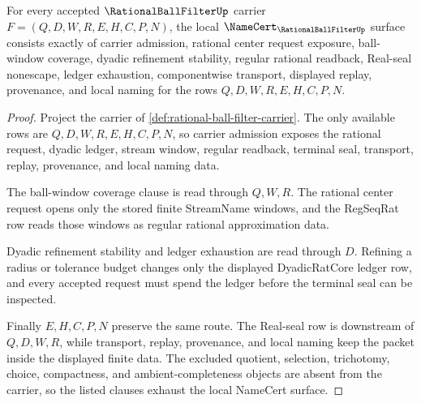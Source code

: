 \begin{theorem}
\label{thm:rational-ball-filter-namecert-obligations}
For every accepted $\RationalBallFilterUp$ carrier $F=(Q,D,W,R,E,H,C,P,N)$, the local $\NameCert_{\RationalBallFilterUp}$ surface consists exactly of carrier admission, rational center request exposure, ball-window coverage, dyadic refinement stability, regular rational readback, Real-seal nonescape, ledger exhaustion, componentwise transport, displayed replay, provenance, and local naming for the rows $Q,D,W,R,E,H,C,P,N$.
\end{theorem}
\begin{proof}
Project the carrier of \autoref{def:rational-ball-filter-carrier}. The only available rows are $Q,D,W,R,E,H,C,P,N$, so carrier admission exposes the rational request, dyadic ledger, stream window, regular readback, terminal seal, transport, replay, provenance, and local naming data.

The ball-window coverage clause is read through $Q,W,R$. The rational center request opens only the stored finite StreamName windows, and the RegSeqRat row reads those windows as regular rational approximation data.

Dyadic refinement stability and ledger exhaustion are read through $D$. Refining a radius or tolerance budget changes only the displayed DyadicRatCore ledger row, and every accepted request must spend the ledger before the terminal seal can be inspected.

Finally $E,H,C,P,N$ preserve the same route. The Real-seal row is downstream of $Q,D,W,R$, while transport, replay, provenance, and local naming keep the packet inside the displayed finite data. The excluded quotient, selection, trichotomy, choice, compactness, and ambient-completeness objects are absent from the carrier, so the listed clauses exhaust the local NameCert surface.
\end{proof}

